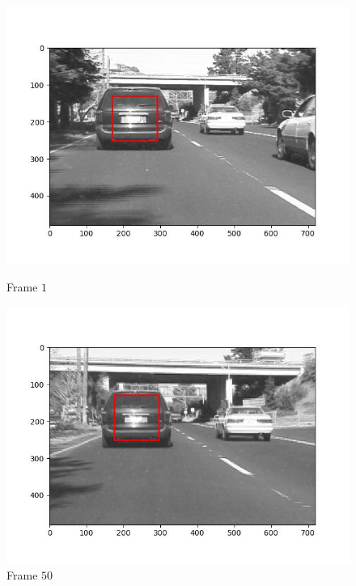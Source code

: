 \begin{figure}[H]
  \centering
  \begin{minipage}{.49\textwidth}
    \centering
    \includegraphics[width=\textwidth]{./figures/lk/car1/frame000001.jpg}
    \caption{Frame $1$}
  \end{minipage}
  \hfill
  \begin{minipage}{.49\textwidth}
    \centering
    \includegraphics[width=\textwidth]{./figures/lk/car1/frame000050.jpg}
    \caption{Frame $50$}
  \end{minipage}
  \hfill
  \begin{minipage}{.49\textwidth}
    \centering

\end{minipage}
\end{figure}
